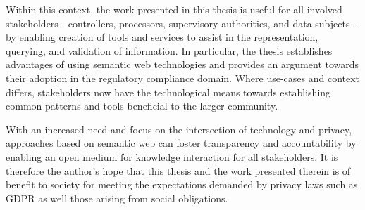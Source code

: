 Within this context, the work presented in this thesis is useful for all involved stakeholders - controllers, processors, supervisory authorities, and data subjects - by enabling creation of tools and services to assist in the representation, querying, and validation of information. In particular, the thesis establishes advantages of using semantic web technologies and provides an argument towards their adoption in the regulatory compliance domain. Where use-cases and context differs, stakeholders now have the technological means towards establishing common patterns and tools beneficial to the larger community.

With an increased need and focus on the intersection of technology and privacy, approaches based on semantic web can foster transparency and accountability by enabling an open medium for knowledge interaction for all stakeholders. It is therefore the author's hope that this thesis and the work presented therein is of benefit to society for meeting the expectations demanded by privacy laws such as GDPR as well those arising from social obligations. 
